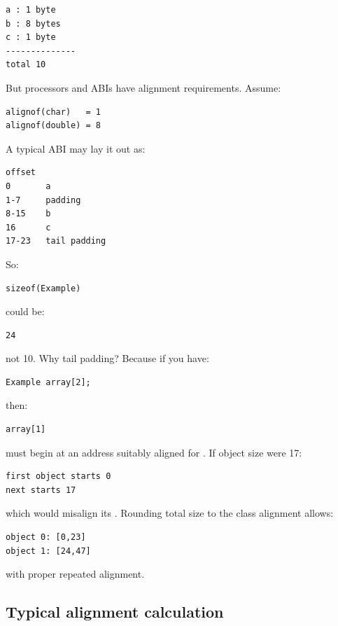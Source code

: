 \begin{verbatim}
a : 1 byte
b : 8 bytes
c : 1 byte
--------------
total 10
\end{verbatim}

But processors and ABIs have alignment requirements. Assume:

\begin{verbatim}
alignof(char)   = 1
alignof(double) = 8
\end{verbatim}

A typical ABI may lay it out as:

\begin{verbatim}
offset
0       a
1-7     padding
8-15    b
16      c
17-23   tail padding
\end{verbatim}

So:

\begin{verbatim}
sizeof(Example)
\end{verbatim}

could be:

\begin{verbatim}
24
\end{verbatim}

not 10. Why tail padding? Because if you have:

\begin{verbatim}
Example array[2];
\end{verbatim}

then:

\begin{verbatim}
array[1]
\end{verbatim}

must begin at an address suitably aligned for . If object size were 17:

\begin{verbatim}
first object starts 0
next starts 17
\end{verbatim}

which would misalign its . Rounding total size to the class alignment allows:

\begin{verbatim}
object 0: [0,23]
object 1: [24,47]
\end{verbatim}

with proper repeated alignment.

\subsection{Typical alignment calculation}\label{05-engine-i-ch003-typical-alignment-calculation}

